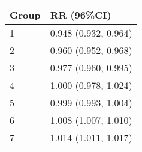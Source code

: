 \begin{tabular}{ll}
  \hline
Group & RR (96\%CI) \\ 
  \hline
   1 & 0.948 (0.932, 0.964) \\ 
     2 & 0.960 (0.952, 0.968) \\ 
     3 & 0.977 (0.960, 0.995) \\ 
     4 & 1.000 (0.978, 1.024) \\ 
     5 & 0.999 (0.993, 1.004) \\ 
     6 & 1.008 (1.007, 1.010) \\ 
     7 & 1.014 (1.011, 1.017) \\ 
   \hline
\end{tabular}

